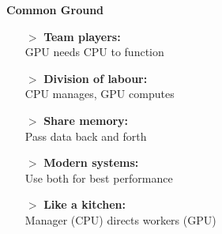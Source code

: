 \documentclass[10pt,a4paper,landscape]{article}
\begin{document}
\hfill
\begin{minipage}[t]{0.32\textwidth}
\begin{centrebox}
\begin{center}
{\large \textcolor{centregrey}{\textbf{Common Ground}}}
\end{center}

\vspace{8mm}

\begin{itemize}[leftmargin=15pt,itemsep=2pt,topsep=0pt]
\item[\textcolor{centregrey}{$>$}] \textbf{Team players:}\\
GPU needs CPU to function
\item[\textcolor{centregrey}{$>$}] \textbf{Division of labour:}\\
CPU manages, GPU computes
\item[\textcolor{centregrey}{$>$}] \textbf{Share memory:}\\
Pass data back and forth
\item[\textcolor{centregrey}{$>$}] \textbf{Modern systems:}\\
Use both for best performance
\item[\textcolor{centregrey}{$>$}] \textbf{Like a kitchen:}\\
Manager (CPU) directs workers (GPU)
\end{itemize}
\end{centrebox}
\end{minipage}
\hfill
\end{document}
